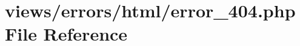\hypertarget{html_2error__404_8php}{}\section{views/errors/html/error\+\_\+404.php File Reference}
\label{html_2error__404_8php}
